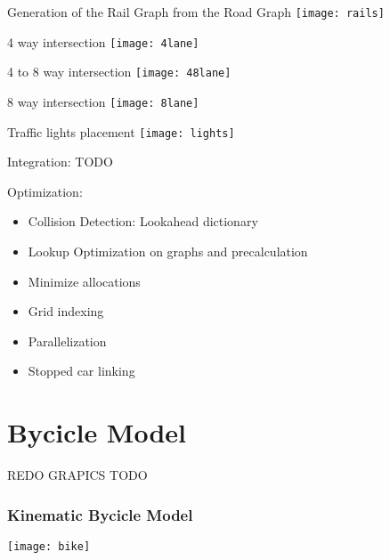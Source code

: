 \documentclass{beamer}
\begin{document}
\begin{frame}
	\begin{center}
	Generation of the Rail Graph from the Road Graph	
	\texttt{[image: rails]}
	\end{center}
\end{frame}

\begin{frame}
	\begin{center}
	4 way intersection	
	\texttt{[image: 4lane]}
	\end{center}
\end{frame}

\begin{frame}
	\begin{center}
	4 to 8 way intersection	
	\texttt{[image: 48lane]}
	\end{center}
\end{frame}

\begin{frame}
	\begin{center}
	8 way intersection	
	\texttt{[image: 8lane]}
	\end{center}
\end{frame}

\begin{frame}
	\begin{center}
	Traffic lights placement
	\texttt{[image: lights]}
	\end{center}
\end{frame}

\begin{frame}
	Integration: TODO

\end{frame}

\begin{frame}
	Optimization:
	\begin{itemize}
		\item Collision Detection: Lookahead dictionary
		\item Lookup Optimization on graphs and precalculation
		\item Minimize allocations
		\item Grid indexing
		\item Parallelization
		\item Stopped car linking
	\end{itemize}
\end{frame}

\section{Bycicle Model}
\begin{frame}
	REDO GRAPICS TODO
	\frametitle{Kinematic Bycicle Model}
\texttt{[image: bike]}
\end{frame}
\end{document}
